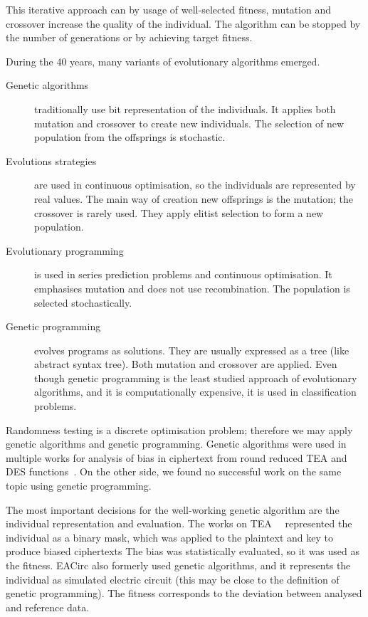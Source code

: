 \documentclass[
  print, %
  Table,   %
  nolof,     %
  nolot,     %
  11pt, %
  oneside  %
]{fithesis3}
\begin{document}
This iterative approach can by usage of well-selected fitness, mutation and crossover increase the quality of the individual. The algorithm can be stopped by the number of generations or by achieving target fitness.

During the 40 years, many variants of evolutionary algorithms emerged.

\begin{description}
    \item[Genetic algorithms] traditionally use bit representation of the individuals. It applies both mutation and crossover to create new individuals. The selection of new population from the offsprings is stochastic.
    \item[Evolutions strategies] are used in continuous optimisation, so the individuals are represented by real values. The main way of creation new offsprings is the mutation; the crossover is rarely used. They apply elitist selection to form a new population.
    \item[Evolutionary programming] is used in series prediction problems and continuous optimisation. It emphasises mutation and does not use recombination. The population is selected stochastically.
    \item[Genetic programming] evolves programs as solutions. They are usually expressed as a tree (like abstract syntax tree). Both mutation and crossover are applied. Even though genetic programming is the least studied approach of evolutionary algorithms, and it is computationally expensive, it is used in classification problems.
\end{description}

Randomness testing is a discrete optimisation problem; therefore we may apply genetic algorithms and genetic programming. Genetic algorithms were used in multiple works for analysis of bias in ciphertext from round reduced TEA and DES functions~\cite{twoRoundsTea,fourRoundsTea,fiveRoundsTea,song2007cryptanalysis,husein2007genetic}. On the other side, we found no successful work on the same topic using genetic programming.

The most important decisions for the well-working genetic algorithm are the individual representation and evaluation. The works on TEA~~\cite{twoRoundsTea,fourRoundsTea,fiveRoundsTea} represented the individual as a binary mask, which was applied to the plaintext and key to produce biased ciphertexts The bias was statistically evaluated, so it was used as the fitness. EACirc also formerly used genetic algorithms, and it represents the individual as simulated electric circuit (this may be close to the definition of genetic programming). The fitness corresponds to the deviation between analysed and reference data.
\end{document}
